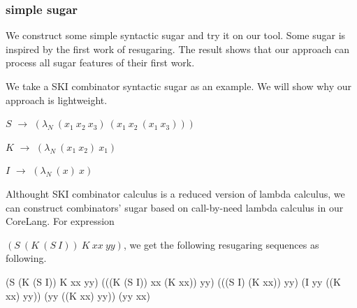 \subsubsection{simple sugar}
\label{mark:simple}

We construct some simple syntactic sugar and try it on our tool. Some sugar is inspired by the first work of resugaring\cite{resugaring}. The result shows that our approach can process all sugar features of their first work.

We take a SKI combinator syntactic sugar as an example. We will show why our approach is lightweight.

\begin{flushleft}
	$S$ $\rightarrow$ $(\lambda _{N}~(x_{1}~x_{2}~x_{3})~(x_{1}~x_{2}~(x_{1}~x_{3})))$
	
	$K$ $\rightarrow$ $(\lambda _{N}~(x_{1}~x_{2})~x_{1})$
	
	$I$ $\rightarrow$ $(\lambda _{N}~(x)~x)$
\end{flushleft}

Althought SKI combinator calculus is a reduced version of lambda calculus, we can construct combinators' sugar based on call-by-need lambda calculus in our CoreLang. For expression

 $(S~(K~(S~I))~K~xx~yy)$, we get the following resugaring sequences as following.
\begin{Codes}
    (S (K (S I)) K xx yy)
\CoreStep (((K (S I)) xx (K xx)) yy)
\CoreStep (((S I) (K xx)) yy)
\CoreStep (I yy ((K xx) yy))
\CoreStep (yy ((K xx) yy))
\CoreStep (yy xx)
\end{Codes}

